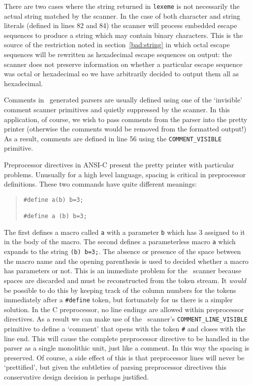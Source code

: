 There are two cases where the string returned in {\tt lexeme} is not necessarily the
actual string matched by the scanner. In the case of both character and string literals
(defined in lines 82 and 84) the scanner will process embedded escape sequences to produce
a string which may contain binary characters. This is the source of the restriction noted in
section~\ref{bad:string} in which octal escape sequences will be rewritten as hexadecimal escape
sequences on output: the scanner does not preserve information on whether a particular escape
sequence was octal or hexadecimal so we have arbitrarily decided to output them all as
hexadecimal.

Comments in \rdp\ generated parsers are usually defined using one of the `invisible' 
comment scanner primitives and quietly suppressed by the scanner. In this application, of
course, we wish to pass comments from the parser into the pretty printer (otherwise the
comments would be removed from the formatted output!) As a result, comments are defined in
line 56 using the \verb+COMMENT_VISIBLE+ primitive.

Preprocessor directives in ANSI-C present the pretty printer with particular problems.
Unusually for a high level language, spacing is critical in preprocessor definitions. These
two commands have quite different meanings:
\begin{quote}
\small
\begin{verbatim}
#define a(b) b=3;

#define a (b) b=3;
\end{verbatim}
\end{quote}
The first defines a macro called {\tt a} with a parameter {\tt b} which has 3 assigned
to it in the body of the macro.
The second defines a parameterless macro {\tt a} which expands to the string \verb+(b) b=3;+.
The absence or presence of the space between the macro name and the opening parenthesis
is used to decided whether a macro has parameters or not. This is an immediate problem for the
\rdp\ scanner because spaces are discarded and must be reconstructed from the token stream.
It {\em would} be possible to do this by keeping track of the column numbers for the
tokens immediately after a \verb+#define+ token, but fortunately for us there is a simpler
solution. In the C preprocessor, no line endings are allowed within preprocessor directives. As
a result we can make use of the \rdp\ scanner's \verb+COMMENT_LINE_VISIBLE+ primitive
to define a `comment' that opens with the token \verb+#+ and closes with the line end. This
will cause the complete preprocessor directive to be handled in the parser as a single
monolithic unit, just like a comment. In this way the spacing is preserved. Of course, a 
side effect of this is that preprocessor lines will never be `prettified', but given
the subtleties of parsing preprocessor directives this conservative design decision is
perhaps justified.


